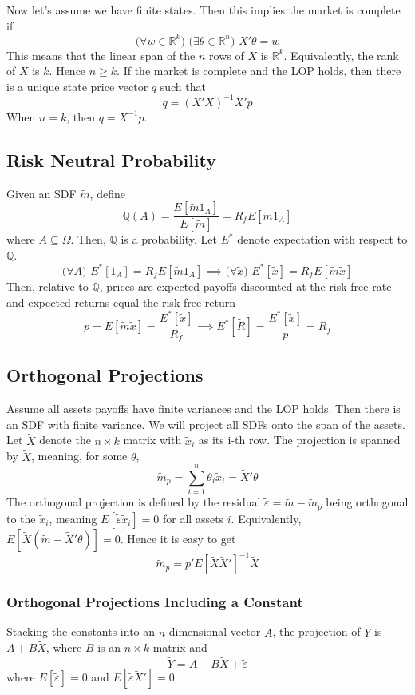 \documentclass[11pt, a4paper, oneside]{article}
\theoremstyle{definition}
\theoremstyle{proposition}
\theoremstyle{corollary}
\theoremstyle{lemma}
\theoremstyle{theorem}
\begin{document}
Now let's assume we have finite states. Then this implies the market is complete if
$$(\forall w \in \mathbb{R}^k\text{) }(\exists \theta \in \mathbb{R}^n\text{) } X'\theta = w$$
This means that the linear span of the $n$ rows of $X$ is $ \mathbb{R}^k$. Equivalently, the rank of $X$ is $k$. Hence $n \geq k$. If the market is complete and the LOP holds, then there is a unique state price vector $q$ such that
$$q = (X'X)^{-1}X'p$$
When $n = k$, then $q = X^{-1}p$. 

\subsection{Risk Neutral Probability}
Given an SDF $\tilde{m}$, define
$$\mathbb{Q}(A) = \frac{E[\tilde{m}1_A]}{E[\tilde{m}]} = R_fE[\tilde{m}1_A]$$
where $A \subseteq \Omega$. Then, $\mathbb{Q}$ is a probability. Let $E^*$ denote expectation with respect to $\mathbb{Q}$.
$$(\forall A\text{) }E^*[1_A] = R_fE[\tilde{m}1_A] \implies (\forall \tilde{x}\text{) } E^*[\tilde{x}] = R_fE[\tilde{m}\tilde{x}]$$
Then, relative to $\mathbb{Q}$, prices are expected payoffs discounted at the risk-free rate and expected returns equal the risk-free return
$$p= E[\tilde{m}\tilde{x}] = \frac{E^*[\tilde{x}]}{R_f} \implies E^*[\tilde{R}] = \frac{E^*[\tilde{x}]}{p} = R_f$$

\subsection{Orthogonal Projections}
Assume all assets payoffs have finite variances and the LOP holds. Then there is an SDF with finite variance. We will project all SDFs onto the span of the assets. Let $\tilde{X}$ denote the $n\times k$ matrix with $\tilde{x}_i$ as its i-th row. The projection is spanned by $\tilde{X}$, meaning, for some $\theta$, 
$$\tilde{m}_p = \sum_{i=1}^n \theta_i \tilde{x}_i = \tilde{X}'\theta$$
The orthogonal projection is defined by the residual $\tilde{\varepsilon} = \tilde{m} - \tilde{m}_p$ being orthogonal to the $\tilde{x}_i$, meaning $E[\tilde{\varepsilon}\tilde{x}_i] = 0$ for all assets $i$. Equivalently, $E[\tilde{X}(\tilde{m} - \tilde{X}'\theta)] = 0$. Hence it is easy to get
$$\tilde{m}_p=p'E[\tilde{X}\tilde{X}']^{-1}\tilde{X}$$

\subsubsection{Orthogonal Projections Including a Constant}
Stacking the constants into an $n$-dimensional vector $A$, the projection of $\tilde{Y}$ is $A + B\tilde{X}$, where $B$ is an $n \times k$ matrix and 
$$\tilde{Y} = A +B\tilde{X} + \tilde{\varepsilon}$$
where $E[\tilde{\varepsilon}] =0$ and $E[\tilde{\varepsilon}\tilde{X}'] = 0$. 
\end{document}
